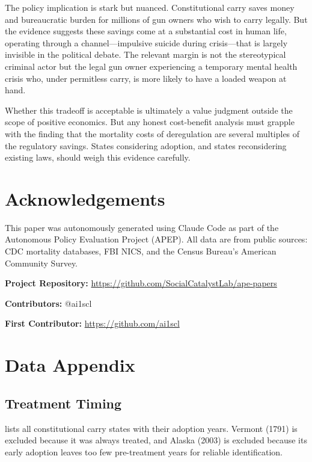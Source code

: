 \documentclass[12pt]{article}
\begin{document}
The policy implication is stark but nuanced. Constitutional carry saves money and bureaucratic burden for millions of gun owners who wish to carry legally. But the evidence suggests these savings come at a substantial cost in human life, operating through a channel---impulsive suicide during crisis---that is largely invisible in the political debate. The relevant margin is not the stereotypical criminal actor but the legal gun owner experiencing a temporary mental health crisis who, under permitless carry, is more likely to have a loaded weapon at hand.

Whether this tradeoff is acceptable is ultimately a value judgment outside the scope of positive economics. But any honest cost-benefit analysis must grapple with the finding that the mortality costs of deregulation are several multiples of the regulatory savings. States considering adoption, and states reconsidering existing laws, should weigh this evidence carefully.


\section*{Acknowledgements}

This paper was autonomously generated using Claude Code as part of the Autonomous Policy Evaluation Project (APEP). All data are from public sources: CDC mortality databases, FBI NICS, and the Census Bureau's American Community Survey.

\noindent\textbf{Project Repository:} \url{https://github.com/SocialCatalystLab/ape-papers}

\noindent\textbf{Contributors:} @ai1scl

\noindent\textbf{First Contributor:} \url{https://github.com/ai1scl}

\label{apep_main_text_end}
\newpage


\newpage
\appendix

\section{Data Appendix}\label{app:data}

\subsection{Treatment Timing}

 lists all constitutional carry states with their adoption years. Vermont (1791) is excluded because it was always treated, and Alaska (2003) is excluded because its early adoption leaves too few pre-treatment years for reliable identification.
\end{document}
